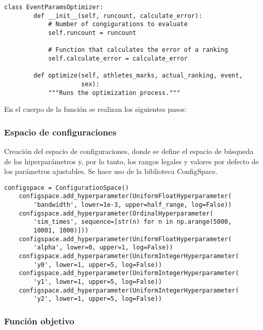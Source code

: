\begin{lstlisting}[caption=Clase EventParamsOptimizer, label = code:optimizer]
    class EventParamsOptimizer:
        def __init__(self, runcount, calculate_error):
            # Number of congigurations to evaluate
            self.runcount = runcount 
            
            # Function that calculates the error of a ranking
            self.calculate_error = calculate_error 

        def optimize(self, athletes_marks, actual_ranking, event,
                     sex):        
            """Runs the optimization process."""

\end{lstlisting}

En el cuerpo de la función se realizan los siguientes pasos:

\subsubsection*{Espacio de configuraciones}	

Creación del espacio de configuraciones, donde se define el espacio de búsqueda de los hiperparámetros y, por lo tanto, los rangos legales y valores por defecto de los parámetros ajustables. Se hace uso de la biblioteca ConfigSpace.

\begin{lstlisting}[caption= Definición del espacio de búsqueda de los hiperparámetros, label = code:configspace]
    configspace = ConfigurationSpace()
    configspace.add_hyperparameter(UniformFloatHyperparameter(
        'bandwidth', lower=1e-3, upper=half_range, log=False))
    configspace.add_hyperparameter(OrdinalHyperparameter(
        'sim_times', sequence=[str(n) for n in np.arange(5000, 
        10001, 1000)]))
    configspace.add_hyperparameter(UniformFloatHyperparameter(
        'alpha', lower=0, upper=1, log=False))
    configspace.add_hyperparameter(UniformIntegerHyperparameter(
        'y0', lower=1, upper=5, log=False))
    configspace.add_hyperparameter(UniformIntegerHyperparameter(
        'y1', lower=1, upper=5, log=False))
    configspace.add_hyperparameter(UniformIntegerHyperparameter(
        'y2', lower=1, upper=5, log=False))
\end{lstlisting}

\subsubsection*{Función objetivo}

